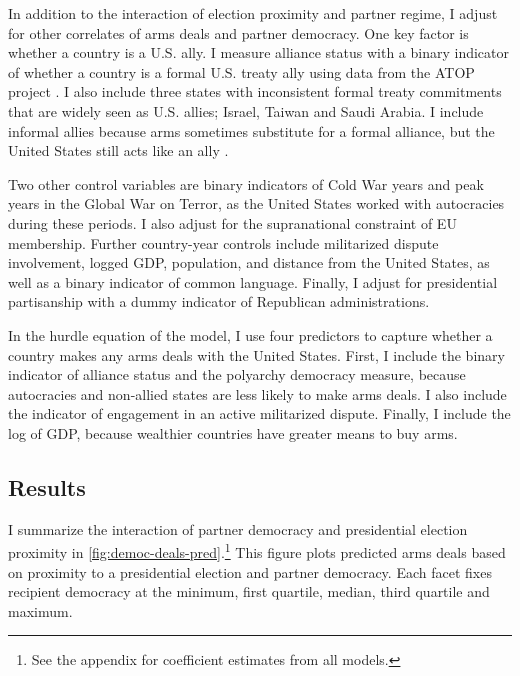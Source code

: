 \documentclass[12pt]{article}
\begin{document}
In addition to the interaction of election proximity and partner regime, I adjust for other correlates of arms deals and partner democracy. 
One key factor is whether a country is a U.S. ally. 
I measure alliance status with a binary indicator of whether a country is a formal U.S. treaty ally using data from the ATOP project \citep{Leedsetal2002}.
I also include three states with inconsistent formal treaty commitments that are widely seen as U.S. allies; Israel, Taiwan and Saudi Arabia. 
I include informal allies because arms sometimes substitute for a formal alliance, but the United States still acts like an ally \citep{Yarhi-Miloetal2016}. 


Two other control variables are binary indicators of Cold War years and peak years in the Global War on Terror, as the United States worked with autocracies during these periods. 
I also adjust for the supranational constraint of EU membership. 
Further country-year controls include militarized dispute involvement, logged GDP, population, and distance from the United States, as well as a binary indicator of common language. 
Finally, I adjust for presidential partisanship with a dummy indicator of Republican administrations.  


In the hurdle equation of the model, I use four predictors to capture whether a country makes any arms deals with the United States. 
First, I include the binary indicator of alliance status and the polyarchy democracy measure, because autocracies and non-allied states are less likely to make arms deals. 
I also include the indicator of engagement in an active militarized dispute. 
Finally, I include the log of GDP, because wealthier countries have greater means to buy arms.


\subsection{Results}


I summarize the interaction of partner democracy and presidential election proximity in \autoref{fig:democ-deals-pred}.\footnote{See the appendix for coefficient estimates from all models.}
This figure plots predicted arms deals based on proximity to a presidential election and partner democracy.
Each facet fixes recipient democracy at the minimum, first quartile, median, third quartile and maximum.
\end{document}
